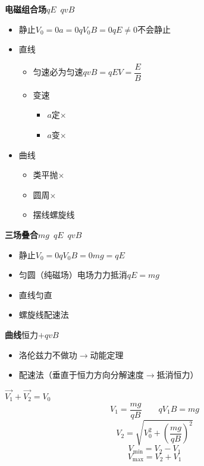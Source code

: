 \textbf{电磁组合场}\quad $qE$\ $qvB$
\begin{itemize}
\item 静止\quad $V_0=0$\quad $a=0$\quad $qV_0B=0$\quad $qE\ne0$\quad 不会静止
\item 直线
  \begin{itemize}
  \item 匀速\quad 必为匀速\quad $qvB=qE$\quad $V=\dfrac{E}{B}$
  \item 变速
    \begin{itemize}
    \item $a$定\quad $\times$
    \item $a$变\quad $\times$
    \end{itemize}
  \end{itemize}
\item 曲线
  \begin{itemize}
  \item 类平抛\quad $\times$
  \item 圆周\quad $\times$
  \item 摆线\quad 螺旋线
  \end{itemize}
\end{itemize}

\textbf{三场叠合}\quad $mg$\ $qE$\ $qvB$
\begin{itemize}
\item 静止\quad $V_0=0$\quad $qV_0B=0$\quad $mg=qE$
\item 匀圆（纯磁场）\quad 电场力力抵消\quad $qE=mg$
\item 直线\quad 匀直
\item 螺旋线\quad 配速法
\end{itemize}

\textbf{曲线}\quad 恒力$+qvB$
\begin{itemize}
\item 洛伦兹力不做功$\to$动能定理
\item 配速法\quad （垂直于恒力方向分解速度$\to$抵消恒力）
\end{itemize}
$\vec{V_1}+\vec{V_2}=V_0$
\[ V_1=\frac{mg}{qB}\qquad qV_1B=mg \]
\[ V_2=\sqrt{V_0^2+\left(\frac{mg}{qB}\right)^2} \]
\[ V_{\min}=V_2-V_1 \]
\[ V_{\max}=V_2+V_1 \]

